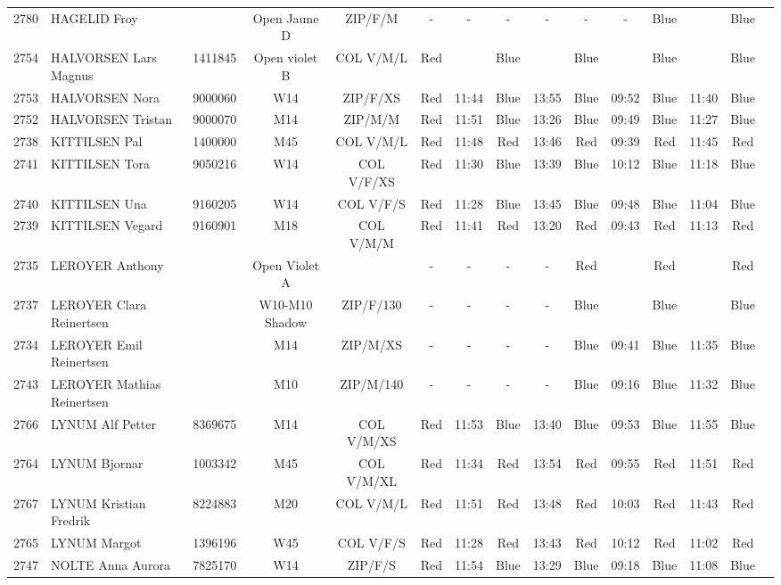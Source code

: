 \documentclass{report}
\begin{document}
\begin{longtable}{|c|l|r|c|c|*{5}{cc|}}
    2780 & HAGELID Froy &  & Open Jaune D & ZIP/F/M & - &  - & - &  - & - &  - & Blue &   & Blue &  \\
    2754 & HALVORSEN Lars Magnus & 1411845 & Open violet B & COL V/M/L & Red &   & Blue &   & Blue &   & Blue &   & Blue &  \\
    2753 & HALVORSEN Nora & 9000060 & W14 & ZIP/F/XS & Red & 11:44 & Blue & 13:55 & Blue & 09:52 & Blue & 11:40 & Blue &  \\
    2752 & HALVORSEN Tristan & 9000070 & M14 & ZIP/M/M & Red & 11:51 & Blue & 13:26 & Blue & 09:49 & Blue & 11:27 & Blue &  \\
    2738 & KITTILSEN Pal & 1400000 & M45 & COL V/M/L & Red & 11:48 & Red & 13:46 & Red & 09:39 & Red & 11:45 & Red &  \\
    2741 & KITTILSEN Tora & 9050216 & W14 & COL V/F/XS & Red & 11:30 & Blue & 13:39 & Blue & 10:12 & Blue & 11:18 & Blue &  \\
    2740 & KITTILSEN Una & 9160205 & W14 & COL V/F/S & Red & 11:28 & Blue & 13:45 & Blue & 09:48 & Blue & 11:04 & Blue &  \\
    2739 & KITTILSEN Vegard & 9160901 & M18 & COL V/M/M & Red & 11:41 & Red & 13:20 & Red & 09:43 & Red & 11:13 & Red &  \\
    2735 & LEROYER Anthony &  & Open Violet A &   & - &  - & - &  - & Red &   & Red &   & Red &  \\
    2737 & LEROYER Clara Reinertsen &  & W10-M10 Shadow & ZIP/F/130 & - &  - & - &  - & Blue &   & Blue &   & Blue &  \\
    2734 & LEROYER Emil Reinertsen &  & M14 & ZIP/M/XS & - &  - & - &  - & Blue & 09:41 & Blue & 11:35 & Blue &  \\
    2743 & LEROYER Mathias Reinertsen &  & M10 & ZIP/M/140 & - &  - & - &  - & Blue & 09:16 & Blue & 11:32 & Blue &  \\
    2766 & LYNUM Alf Petter & 8369675 & M14 & COL V/M/XS & Red & 11:53 & Blue & 13:40 & Blue & 09:53 & Blue & 11:55 & Blue &  \\
    2764 & LYNUM Bjornar & 1003342 & M45 & COL V/M/XL & Red & 11:34 & Red & 13:54 & Red & 09:55 & Red & 11:51 & Red &  \\
    2767 & LYNUM Kristian Fredrik & 8224883 & M20 & COL V/M/L & Red & 11:51 & Red & 13:48 & Red & 10:03 & Red & 11:43 & Red &  \\
    2765 & LYNUM Margot & 1396196 & W45 & COL V/F/S & Red & 11:28 & Red & 13:43 & Red & 10:12 & Red & 11:02 & Red &  \\
    2747 & NOLTE Anna Aurora & 7825170 & W14 & ZIP/F/S & Red & 11:54 & Blue & 13:29 & Blue & 09:18 & Blue & 11:08 & Blue &  \\

\end{longtable}
\end{document}
